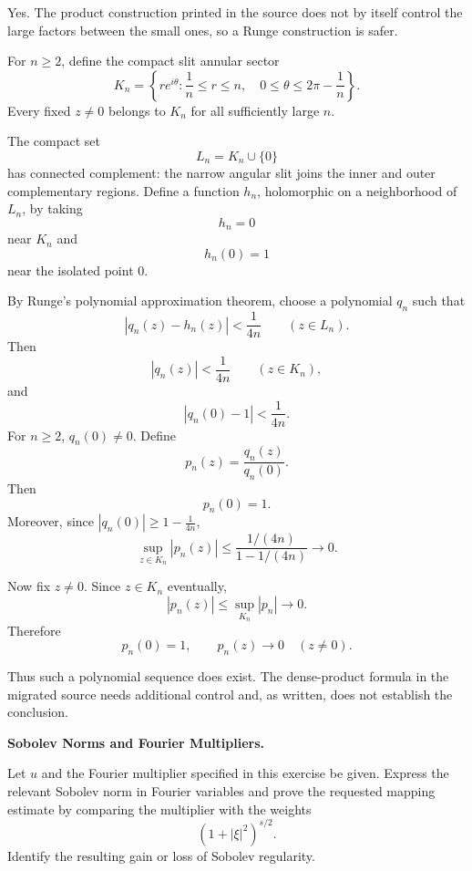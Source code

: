 \begin{solution}
Yes. The product construction printed in the source does not by itself control the large
factors between the small ones, so a Runge construction is safer.

For \(n\ge2\), define the compact slit annular sector
\[
K_n
=
\left\{
re^{i\theta}:
\frac1n\le r\le n,\quad
0\le\theta\le2\pi-\frac1n
\right\}.
\]
Every fixed \(z\neq0\) belongs to \(K_n\) for all sufficiently large \(n\).

The compact set
\[
L_n=K_n\cup\{0\}
\]
has connected complement: the narrow angular slit joins the inner and outer complementary
regions. Define a function \(h_n\), holomorphic on a neighborhood of \(L_n\), by taking
\[
h_n=0
\]
near \(K_n\) and
\[
h_n(0)=1
\]
near the isolated point \(0\).

By Runge's polynomial approximation theorem, choose a polynomial \(q_n\) such that
\[
|q_n(z)-h_n(z)|<\frac1{4n}
\qquad(z\in L_n).
\]
Then
\[
|q_n(z)|<\frac1{4n}
\qquad(z\in K_n),
\]
and
\[
|q_n(0)-1|<\frac1{4n}.
\]
For \(n\ge2\), \(q_n(0)\neq0\). Define
\[
p_n(z)=\frac{q_n(z)}{q_n(0)}.
\]
Then
\[
p_n(0)=1.
\]
Moreover, since \(|q_n(0)|\ge1-\frac1{4n}\),
\[
\sup_{z\in K_n}|p_n(z)|
\le
\frac{1/(4n)}{1-1/(4n)}
\longrightarrow0.
\]

Now fix \(z\neq0\). Since \(z\in K_n\) eventually,
\[
|p_n(z)|
\le
\sup_{K_n}|p_n|
\longrightarrow0.
\]
Therefore
\[
\boxed{
p_n(0)=1,
\qquad
p_n(z)\to0\quad(z\neq0).
}
\]

Thus such a polynomial sequence does exist. The dense-product formula in the migrated source
needs additional control and, as written, does not establish the conclusion.
\end{solution}


\begin{problem}[CP-II-0033]
\label{prob:cp-ii-0033}
\textbf{Sobolev Norms and Fourier Multipliers.}

\hspace*{1.5em}Let \(u\) and the Fourier multiplier specified in this exercise be given.
Express the relevant Sobolev norm in Fourier variables and prove the requested
mapping estimate by comparing the multiplier with the weights
\[
(1+|\xi|^2)^{s/2}.
\]
Identify the resulting gain or loss of Sobolev regularity.
\end{problem}

